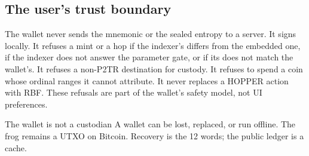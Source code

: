 \subsection{The user's trust boundary}

The wallet never sends the mnemonic or the sealed entropy to a server. It
signs locally. It refuses a mint or a hop if the indexer's
 differs from the embedded one, if the indexer does not
answer the parameter gate, or if its  does not match the
wallet's. It refuses a non-P2TR destination for custody. It refuses to spend
a coin whose ordinal ranges it cannot attribute. It never replaces a HOPPER
action with RBF. These refusals are part of the wallet's safety model, not UI
preferences.

\begin{invariant}{The wallet is not a custodian}
A wallet can be lost, replaced, or run offline. The frog remains a UTXO on
Bitcoin. Recovery is the 12 words; the public ledger is a cache.
\end{invariant}
